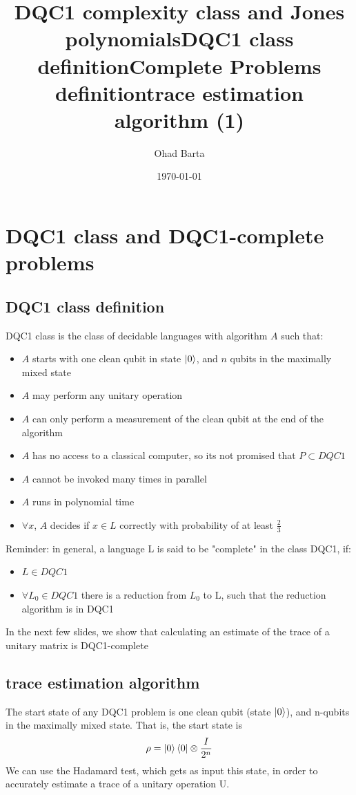 \documentclass{article}
\begin{document}
\title{DQC1 complexity class and Jones polynomials} 
\author{Ohad Barta}
\date{\today} 

\titlepage
\tableofcontents



\section{DQC1 class and DQC1-complete problems}
\subsection{DQC1 class definition  } 
\title{DQC1 class definition} 
DQC1 class is the class of decidable languages with algorithm $A$ such that:
\begin{itemize}
\item $A$ starts with one clean qubit in state $\left\vert{0}\right\rangle$, and $n$ qubits in the maximally mixed state
\item $A$ may perform any unitary operation
\item $A$ can only perform a measurement of the clean qubit at the end of the algorithm
\item $A$ has no access to a classical computer, so its not promised that $P \subset DQC1$ 
\item $A$ cannot be invoked many times in parallel
\item $A$ runs in polynomial time
\item $\forall x$, $A$ decides if $x \in L$ correctly with probability of at least $\frac{2}{3}$
\end{itemize}


\title{Complete Problems definition} 
Reminder: in general, a language L is said to be "complete" in the class DQC1, if:
\begin{itemize}
\item $L \in DQC1$
\item $\forall L_{0} \in DQC1$ there is a reduction from $L_{0}$ to L, such that the reduction algorithm is in DQC1  
\end{itemize}
In the next few slides, we show that calculating an estimate of the trace of a unitary matrix is DQC1-complete


\subsection{trace estimation algorithm  }
\title{trace estimation algorithm (1)}
The start state of any DQC1 problem is one clean qubit (state $\left\vert{0}\right\rangle$), and n-qubits in the maximally mixed state.
That is, the start state is
\begin{equation}
\rho = \left\vert{0}\right\rangle\left\langle{0}\right\vert\otimes\frac{I}{2^n}
\end{equation}
We can use the Hadamard test, which gets as input this state, in order to accurately estimate a trace
of a unitary operation U.
\end{document}
